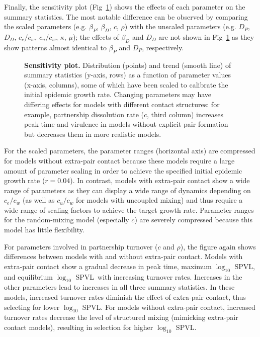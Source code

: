 \documentclass[10pt,letterpaper]{article}
\renewcommand{\figurename}{Fig}
\newcommand{\Lspvl}{$\log_{10}$ SPVL}
\begin{document}
Finally, the sensitivity plot (\figurename~\ref{fig:plot_sens}) shows the effects 
of each parameter on the summary statistics. 
The most notable difference can be observed by comparing the scaled parameters (e.g. $\beta_P$, $\beta_D$, $c$, $\rho$) with the unscaled parameters (e.g. $D_P$, $D_D$, $c_e/c_w$, $c_u/c_w$, $\kappa$, $\mu$);
the effects of $\beta_D$ and $D_D$ are not shown in \figurename~\ref{fig:plot_sens} as 
they show patterns almost identical to $\beta_P$ and $D_P$, respectively.

\begin{figure}[!ht]
\caption{{\bf Sensitivity plot.}
Distribution (points) and trend (smooth line) of summary statistics (y-axis,
rows) as a function of parameter values (x-axis, columns), some of which have been scaled to calibrate the initial epidemic growth rate.
Changing parameters may have differing effects for models with different
contact structures: for example, partnership dissolution rate ($c$, third column) increases peak time and virulence in models without explicit pair formation but decreases them in more realistic models.
}
\label{fig:plot_sens}
\end{figure}

For the scaled parameters, the parameter ranges 
(horizontal axis) are compressed 
for models without extra-pair contact because these models 
require a large amount of parameter scaling in order 
to achieve the specified initial epidemic growth rate ($r=0.04$).
In contrast, models with extra-pair contact show a wide range of parameters as they can display a wide range of dynamics depending on $c_e/c_w$ (as well as $c_u/c_w$ for models with uncoupled mixing) and thus require a wide range of scaling factors to achieve the target growth rate.
Parameter ranges for the random-mixing model (especially $c$) are severely compressed because this model has little flexibility.

For parameters involved in partnership turnover ($c$ and $\rho$), 
the figure again shows differences between models with and without extra-pair contact. Models with extra-pair contact show a gradual decrease in peak time, maximum \Lspvl, and equilibrium \Lspvl\ with increasing turnover rates.
Increases in the other parameters lead to increases in all
three summary statistics.
In these models, increased turnover rates diminish the effect of extra-pair contact, thus selecting for lower \Lspvl.
For models without extra-pair contact, increased turnover rates
decrease the level of structured mixing (mimicking extra-pair contact models), resulting in selection for higher \Lspvl.
\end{document}
